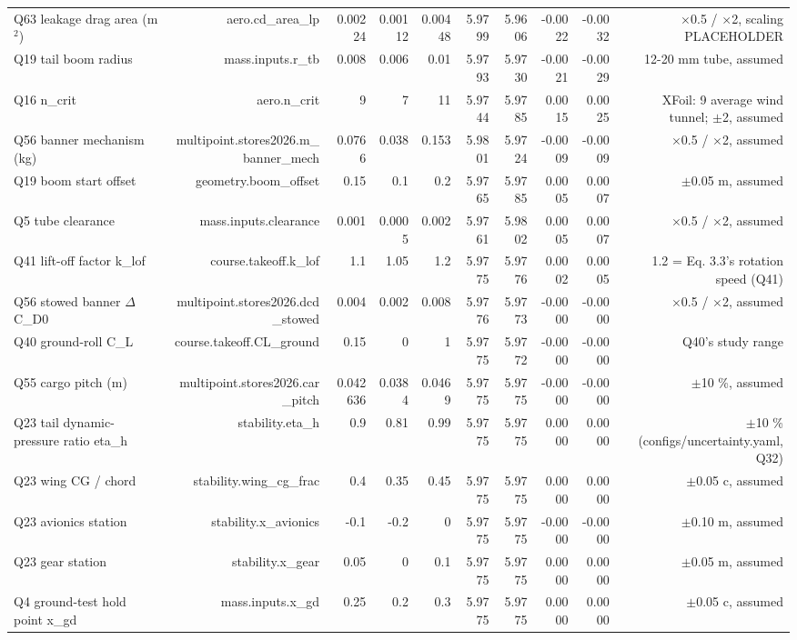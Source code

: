 \begin{table}[htbp]
{\begin{tabular}{lrrrrrrrrr}
Q63 leakage drag area (m$^2$) & aero.cd\_area\_lp & 0.00224 & 0.00112 & 0.00448 & 5.9799 & 5.9606 & -0.0022 & -0.0032 & $\times$0.5 / $\times$2, scaling PLACEHOLDER \\
Q19 tail boom radius & mass.inputs.r\_tb & 0.008 & 0.006 & 0.01 & 5.9793 & 5.9730 & -0.0021 & -0.0029 & 12-20 mm tube, assumed \\
Q16 n\_crit & aero.n\_crit & 9 & 7 & 11 & 5.9744 & 5.9785 & 0.0015 & 0.0025 & XFoil: 9 average wind tunnel; $\pm$2, assumed \\
Q56 banner mechanism (kg) & multipoint.stores2026.m\_banner\_mech & 0.0766 & 0.038 & 0.153 & 5.9801 & 5.9724 & -0.0009 & -0.0009 & $\times$0.5 / $\times$2, assumed \\
Q19 boom start offset & geometry.boom\_offset & 0.15 & 0.1 & 0.2 & 5.9765 & 5.9785 & 0.0005 & 0.0007 & $\pm$0.05 m, assumed \\
Q5 tube clearance & mass.inputs.clearance & 0.001 & 0.0005 & 0.002 & 5.9761 & 5.9802 & 0.0005 & 0.0007 & $\times$0.5 / $\times$2, assumed \\
Q41 lift-off factor k\_lof & course.takeoff.k\_lof & 1.1 & 1.05 & 1.2 & 5.9775 & 5.9776 & 0.0002 & 0.0005 & 1.2 = Eq. 3.3's rotation speed (Q41) \\
Q56 stowed banner $\Delta$C\_D0 & multipoint.stores2026.dcd\_stowed & 0.004 & 0.002 & 0.008 & 5.9776 & 5.9773 & -0.0000 & -0.0000 & $\times$0.5 / $\times$2, assumed \\
Q40 ground-roll C\_L & course.takeoff.CL\_ground & 0.15 & 0 & 1 & 5.9775 & 5.9772 & -0.0000 & -0.0000 & Q40's study range \\
Q55 cargo pitch (m) & multipoint.stores2026.car\_pitch & 0.042636 & 0.0384 & 0.0469 & 5.9775 & 5.9775 & -0.0000 & -0.0000 & $\pm$10 \%, assumed \\
Q23 tail dynamic-pressure ratio eta\_h & stability.eta\_h & 0.9 & 0.81 & 0.99 & 5.9775 & 5.9775 & 0.0000 & 0.0000 & $\pm$10 \% (configs/uncertainty.yaml, Q32) \\
Q23 wing CG / chord & stability.wing\_cg\_frac & 0.4 & 0.35 & 0.45 & 5.9775 & 5.9775 & 0.0000 & 0.0000 & $\pm$0.05 c, assumed \\
Q23 avionics station & stability.x\_avionics & -0.1 & -0.2 & 0 & 5.9775 & 5.9775 & -0.0000 & -0.0000 & $\pm$0.10 m, assumed \\
Q23 gear station & stability.x\_gear & 0.05 & 0 & 0.1 & 5.9775 & 5.9775 & 0.0000 & 0.0000 & $\pm$0.05 m, assumed \\
Q4 ground-test hold point x\_gd & mass.inputs.x\_gd & 0.25 & 0.2 & 0.3 & 5.9775 & 5.9775 & 0.0000 & 0.0000 & $\pm$0.05 c, assumed \\

\end{tabular}}
\end{table}
